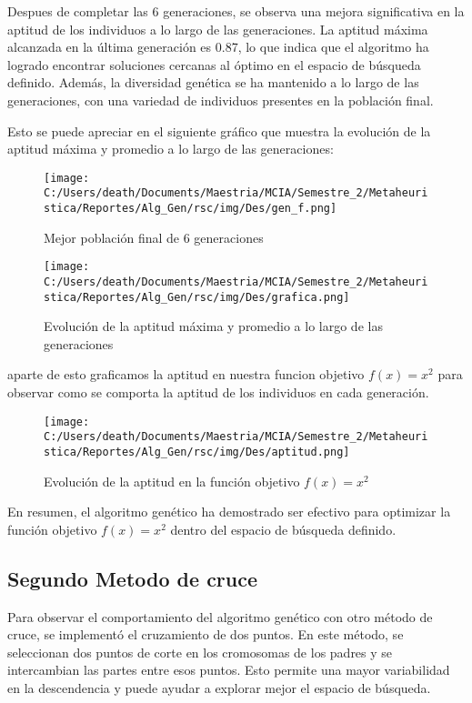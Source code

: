 Despues de completar las 6 generaciones, se observa una mejora significativa en la aptitud de los individuos a lo largo de las generaciones.
La aptitud máxima alcanzada en la última generación es 0.87, lo que indica que el algoritmo ha logrado encontrar soluciones cercanas al óptimo en el espacio de búsqueda definido.
Además, la diversidad genética se ha mantenido a lo largo de las generaciones, con una variedad de individuos presentes en la población final.

Esto se puede apreciar en el siguiente gráfico que muestra la evolución de la aptitud máxima y promedio a lo largo de las generaciones:
\begin{figure} [H]
    \centering
    \texttt{[image: C:/Users/death/Documents/Maestria/MCIA/Semestre\_2/Metaheuristica/Reportes/Alg\_Gen/rsc/img/Des/gen\_f.png]}
    \caption{Mejor población final de 6 generaciones}\label{Gen_final}
\end{figure}
\begin{figure} [H]
    \centering
    \texttt{[image: C:/Users/death/Documents/Maestria/MCIA/Semestre\_2/Metaheuristica/Reportes/Alg\_Gen/rsc/img/Des/grafica.png]}
    \caption{Evolución de la aptitud máxima y promedio a lo largo de las generaciones}\label{Grafica}
\end{figure}

aparte de esto graficamos la aptitud en nuestra funcion objetivo $f(x) = x^2$ para observar como se comporta la aptitud de los individuos en cada generación.

\begin{figure} [H]
    \centering
    \texttt{[image: C:/Users/death/Documents/Maestria/MCIA/Semestre\_2/Metaheuristica/Reportes/Alg\_Gen/rsc/img/Des/aptitud.png]}
    \caption{Evolución de la aptitud en la función objetivo $f(x) = x^2$}\label{Grafica_fitness}
\end{figure}

En resumen, el algoritmo genético ha demostrado ser efectivo para optimizar la función objetivo $f(x) = x^2$ dentro del espacio de búsqueda definido.

\subsection{Segundo Metodo de cruce}
Para observar el comportamiento del algoritmo genético con otro método de cruce, se implementó el cruzamiento de dos puntos. En este método, se seleccionan 
dos puntos de corte en los cromosomas de los padres y se intercambian las partes entre esos puntos. Esto permite una mayor variabilidad en la descendencia y 
puede ayudar a explorar mejor el espacio de búsqueda.


